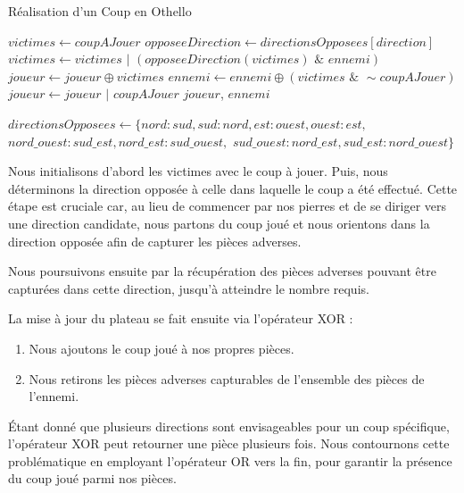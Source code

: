 \begin{algorithm}
    \caption{Réalisation d'un Coup en Othello}
    \begin{algorithmic}[1]
            \State $victimes \gets coupAJouer$
            \State $opposeeDirection \gets directionsOpposees[direction]$
                \State $victimes \gets victimes \,\, | \,\,(opposeeDirection(victimes) \,\, \& \,\, ennemi)$
            \EndFor
            \State $joueur \gets joueur \oplus victimes$
            \State $ennemi \gets ennemi \oplus (victimes \,\, \& \,\, \sim coupAJouer)$
        \EndFor
        \State $joueur \gets joueur \,\, | \,\, coupAJouer$
        \State \Return $joueur$, $ennemi$
    \EndFunction

    \State
    \State $directionsOpposees \gets \{nord: sud, sud: nord, est: ouest, ouest: est,$
    \Statex \hspace{\algorithmicindent} $nord\_ouest: sud\_est, nord\_est: sud\_ouest,$
    \Statex \hspace{\algorithmicindent} $sud\_ouest: nord\_est, sud\_est: nord\_ouest\}$
    \end{algorithmic}
    \label{alg:play_move}
\end{algorithm}
Nous initialisons d'abord les victimes avec le coup à jouer. Puis, nous déterminons la direction opposée à celle dans laquelle le coup a été effectué. Cette étape est cruciale car, au lieu de commencer par nos pierres et de se diriger vers une direction candidate, nous partons du coup joué et nous orientons dans la direction opposée afin de capturer les pièces adverses.

Nous poursuivons ensuite par la récupération des pièces adverses pouvant être capturées dans cette direction, jusqu'à atteindre le nombre requis.

La mise à jour du plateau se fait ensuite via l'opérateur XOR :
\begin{enumerate}
    \item Nous ajoutons le coup joué à nos propres pièces.
    \item Nous retirons les pièces adverses capturables de l'ensemble des pièces de l'ennemi.
\end{enumerate}

Étant donné que plusieurs directions sont envisageables pour un coup spécifique, l'opérateur XOR peut retourner une pièce plusieurs fois. Nous contournons cette problématique en employant l'opérateur OR vers la fin, pour garantir la présence du coup joué parmi nos pièces.

